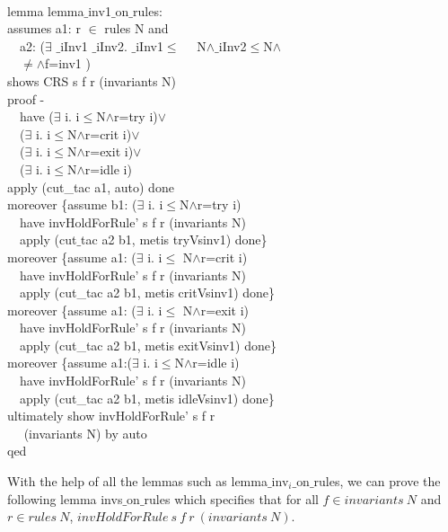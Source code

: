 \begin{specification}
\\
lemma lemma$\_$inv1$\_$on$\_$rules:\\
assumes a1: r $\in$ rules N and \\
~~a2: ($\exists$ $\_$iInv1 $\_$iInv2. $\_$iInv1$\le$
~~N$\wedge$$\_$iInv2$\le$N$\wedge$ \\
~~$\neq$$\wedge$f=inv1   )\\
shows CRS s f r (invariants N)\\
proof -\\
~~have ($\exists$ i. i$\le$N$\wedge$r=try  i)$\vee$ \\
~~($\exists$ i. i$\le$N$\wedge$r=crit  i)$\vee$ \\
~~($\exists$ i. i$\le$N$\wedge$r=exit  i)$\vee$\\
~~($\exists$ i. i$\le$N$\wedge$r=idle  i)\\
apply (cut\_tac a1, auto) done\\
moreover \{assume b1: ($\exists$ i. i$\le$N$\wedge$r=try  i)\\
~~have invHoldForRule' s f r (invariants N)\\
~~apply (cut$\_$tac a2 b1, metis tryVsinv1) done\}\\
moreover \{assume a1: ($\exists$ i. i$\le$ N$\wedge$r=crit  i)\\
~~have invHoldForRule' s f r (invariants N)\\
~~apply (cut\_tac a2 b1, metis critVsinv1) done\}\\
moreover \{assume a1: ($\exists$ i. i$\le$ N$\wedge$r=exit  i)\\
~~have invHoldForRule' s f r (invariants N)\\
~~apply (cut\_tac a2 b1, metis exitVsinv1) done\}\\
moreover \{assume a1:($\exists$ i. i$\le$N$\wedge$r=idle  i)\\
~~have invHoldForRule' s f r (invariants N)\\
~~apply (cut\_tac a2 b1, metis idleVsinv1) done\}\\
ultimately show invHoldForRule' s f r \\
~~ (invariants N) by auto\\
qed\\
\end{specification}

With the help of all the lemmas such as {\sf lemma$\_$inv$_i\_$on$\_$rules},
we can prove the following lemma  {\sf invs$\_$on$\_$rules} which
specifies that for all $f \in invariants~ N$ and $r \in rules~ N$,
$invHoldForRule ~s~ f~ r~ (invariants~ N)$.

